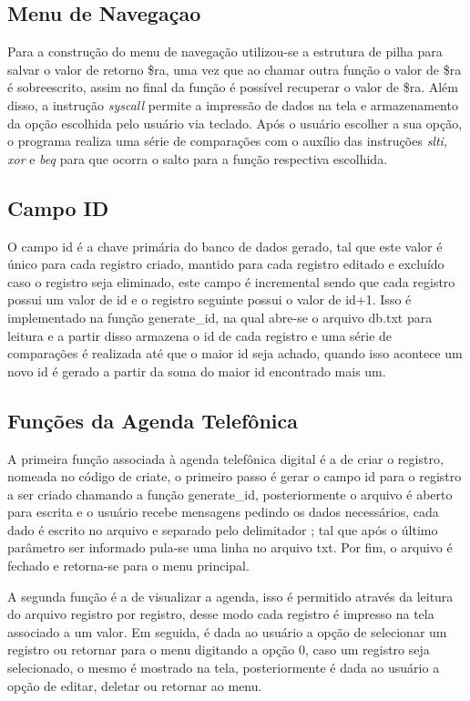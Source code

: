 \documentclass[10pt,twocolumn,letterpaper]{article}
\begin{document}
\subsection{Menu de Navegaçao}

Para a construção do menu de navegação utilizou-se a estrutura de pilha para salvar o valor de retorno \$ra, uma vez que ao chamar outra função o valor de \$ra é sobreescrito, assim no final da função é possível recuperar o valor de \$ra. Além disso, a instrução \textit{syscall} permite a impressão de dados na tela e armazenamento da opção escolhida pelo usuário via teclado. Após o usuário escolher a sua opção, o programa realiza uma série de comparações com o auxílio das instruções \textit{slti}, \textit{xor} e \textit{beq} para que ocorra o salto para a função respectiva escolhida.

\subsection{Campo ID}

O campo id é a chave primária do banco de dados gerado, tal que este valor é único para cada registro criado, mantido para cada registro editado e excluído caso o registro seja eliminado, este campo é incremental sendo que cada registro possui um valor de id e o registro seguinte possui o valor de id+1. Isso é implementado na função generate\_id, na qual abre-se o arquivo db.txt para leitura e a partir disso armazena o id de cada registro e uma série de comparações é realizada até que o maior id seja achado, quando isso acontece um novo id é gerado a partir da soma do maior id encontrado mais um.

\subsection{Funções da Agenda Telefônica}

A primeira função associada à agenda telefônica digital é a de criar o registro, nomeada no código de criate, o primeiro passo é gerar o campo id para o registro a ser criado chamando a função generate\_id, posteriormente o arquivo é aberto para escrita e o usuário recebe mensagens pedindo os dados necessários, cada dado é escrito no arquivo e separado pelo delimitador ; tal que após o último parâmetro ser informado pula-se uma linha no arquivo txt. Por fim, o arquivo é fechado e retorna-se para o menu principal.

A segunda função é a de visualizar a agenda, isso é permitido através da leitura do arquivo registro por registro, desse modo cada registro é impresso na tela associado a um valor. Em seguida, é dada ao usuário a opção de selecionar um registro ou retornar para o menu digitando a opção 0, caso um registro seja selecionado, o mesmo é mostrado na tela, posteriormente é dada ao usuário a opção de editar, deletar ou retornar ao menu.
\end{document}
